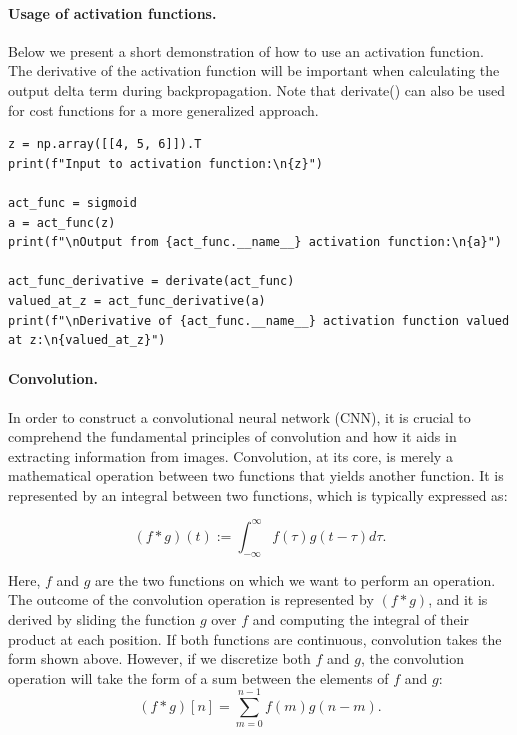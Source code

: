 \documentclass[%
oneside,                 %
final,                   %
10pt]{article}
\begin{document}
\paragraph{Usage of activation functions.}
Below we present a short demonstration of how to use an activation
function. The derivative of the activation function will be important
when calculating the output delta term during backpropagation. Note
that derivate() can also be used for cost functions for a more
generalized approach.












\begin{verbatim}
z = np.array([[4, 5, 6]]).T
print(f"Input to activation function:\n{z}")

act_func = sigmoid
a = act_func(z)
print(f"\nOutput from {act_func.__name__} activation function:\n{a}")

act_func_derivative = derivate(act_func)
valued_at_z = act_func_derivative(a)
print(f"\nDerivative of {act_func.__name__} activation function valued at z:\n{valued_at_z}")

\end{verbatim}


\paragraph{Convolution.}
In order to construct a convolutional neural network (CNN), it is
crucial to comprehend the fundamental principles of convolution and
how it aids in extracting information from images. Convolution, at its
core, is merely a mathematical operation between two functions that
yields another function. It is represented by an integral between two
functions, which is typically expressed as:

\[
(f \ast g)(t):=\int_{-\infty}^{\infty} f(\tau) g(t-\tau) d \tau.
\]

Here, $f$ and $g$ are the two functions on which we want to perform an
operation. The outcome of the convolution operation is represented by
$(f \ast g)$, and it is derived by sliding the function $g$ over $f$ and
computing the integral of their product at each position. If both
functions are continuous, convolution takes the form shown
above. However, if we discretize both $f$ and $g$, the convolution
operation will take the form of a sum between the elements of $f$ and $g$:
\[
(f \ast g)[n]=\sum_{m=0}^{n-1} f(m) g(n-m).
\]
\end{document}
